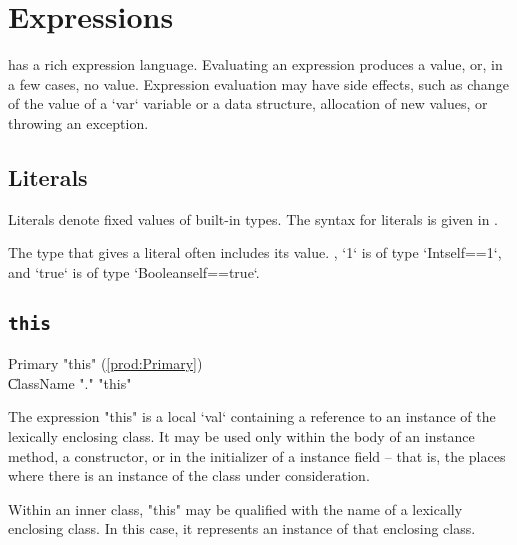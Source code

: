  \chapter{Expressions}\label{XtenExpressions}

\Xten{} has a rich expression language.
Evaluating an expression produces a value, or, in a few cases, no value. 
Expression evaluation may have side effects, such as change of the value of a 
\xcd`var` variable or a data structure, allocation of new values, or throwing
an exception. 



\section{Literals}

Literals denote fixed values of built-in types. 
The syntax for literals is given in . 

The type that \Xten{} gives a literal often includes its value. \Eg, \xcd`1`
is of type \xcd`Int{self==1}`, and \xcd`true` is of type
\xcd`Boolean{self==true}`.

\section{{\tt this}}

\begin{bbgrammar}
             Primary \: \xcd"this" (\ref{prod:Primary}) \\
                    \| ClassName \xcd"." \xcd"this" \\
\end{bbgrammar}


The expression \xcd"this" is a  local \xcd`val` containing a reference
to an instance of the lexically enclosing class.
It may be used only within the body of an instance method, a
constructor, or in the initializer of a instance field -- that is, the places
where there is an instance of the class under consideration.

Within an inner class, \xcd"this" may be qualified with the
name of a lexically enclosing class.  In this case, it
represents an instance of that enclosing class.  


